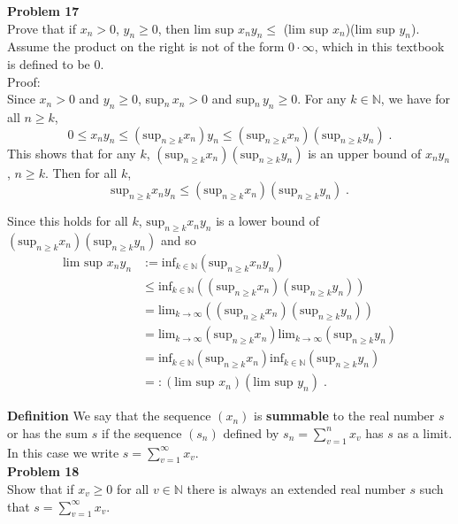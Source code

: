 \documentclass[a4paper]{article}
\begin{document}
{\bf Problem 17}\\
Prove that if $x_n > 0$, $y_n\geq 0$, then lim sup $x_ny_n \leq $ (lim sup $x_n$)(lim sup $y_n$). Assume the product on the right is not of the form $0 \cdot \infty$, which in this textbook is defined to be 0.\\

Proof:\\

Since $x_n > 0$ and $y_n \geq 0$, sup$_n \,x_n> 0$ and sup$_n \,y_n \geq 0$. For any $k \in \mathbb{N}$, we have for all $n\geq k$,
$$0 \leq x_ny_n \leq (\text{sup}_{n\geq k} x_n )y_n \leq (\text{sup}_{n\geq k} x_n )(\text{sup}_{n\geq k} y_n )\;.$$
This shows that for any $k$, $(\text{sup}_{n\geq k} x_n )(\text{sup}_{n\geq k} y_n )$ is an upper bound of $x_ny_n$, $n\geq k$. Then for all $k$, $$\text{sup}_{n\geq k} x_ny_n \leq (\text{sup}_{n\geq k} x_n )(\text{sup}_{n\geq k} y_n )\;.$$

Since this holds for all $k$, $\text{sup}_{n\geq k} x_ny_n$ is a lower bound of $(\text{sup}_{n\geq k} x_n )(\text{sup}_{n\geq k} y_n )$ and so
\begin{align*}
\text{lim sup } x_ny_n &:= \text{inf}_{k \in \mathbb{N}}(\text{sup}_{n\geq k} x_ny_n)\\
&\leq \text{inf}_{k \in \mathbb{N}}((\text{sup}_{n\geq k} x_n )(\text{sup}_{n\geq k} y_n ))\\
&=\text{lim}_{k\rightarrow \infty}\left((\text{sup}_{n\geq k} x_n )(\text{sup}_{n\geq k} y_n )\right)\\
&=\text{lim}_{k\rightarrow \infty}(\text{sup}_{n\geq k} x_n )\text{lim}_{k\rightarrow \infty}(\text{sup}_{n\geq k} y_n )\\
&=\text{inf}_{k\in \mathbb{N}}(\text{sup}_{n\geq k} x_n )\text{inf}_{k\in \mathbb{N}}(\text{sup}_{n\geq k} y_n )\\
&=:(\text{lim sup }x_n)(\text{lim sup }y_n) \;.
\end{align*}

{\bf Definition} We say that the sequence $(x_n)$ is {\bf summable} to the real number $s$ or has the sum $s$ if the sequence $(s_n)$ defined by $s_n = \sum_{v=1}^n x_v$ has $s$ as a limit. In this case we write $s = \sum_{v=1}^\infty x_v$.\\

{\bf Problem 18}\\
Show that if $x_v \geq 0$ for all $v \in \mathbb{N}$ there is always an extended real number $s$ such that $s = \sum_{v=1}^\infty x_v$.\\
\end{document}
